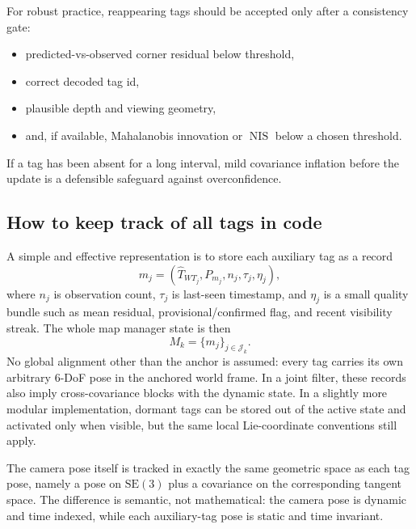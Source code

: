 \documentclass[11pt]{report}
\newcommand{\SE}{\mathrm{SE}(3)}
\newcommand{\NIS}{\operatorname{NIS}}
\begin{document}
For robust practice, reappearing tags should be accepted only after a consistency gate:
\begin{itemize}
    \item predicted-vs-observed corner residual below threshold,
    \item correct decoded tag id,
    \item plausible depth and viewing geometry,
    \item and, if available, Mahalanobis innovation or $\NIS$ below a chosen threshold.
\end{itemize}
If a tag has been absent for a long interval, mild covariance inflation before the update is a defensible safeguard against overconfidence.

\subsection{How to keep track of all tags in code}
A simple and effective representation is to store each auxiliary tag as a record
\[
m_j = (\widehat T_{WT_j},P_{m_j},n_j,\tau_j,\eta_j),
\]
where $n_j$ is observation count, $\tau_j$ is last-seen timestamp, and $\eta_j$ is a small quality bundle such as mean residual, provisional/confirmed flag, and recent visibility streak. The whole map manager state is then
\[
M_k=\{m_j\}_{j\in\mathcal J_k}.
\]
No global alignment other than the anchor is assumed: every tag carries its own arbitrary 6-DoF pose in the anchored world frame. In a joint filter, these records also imply cross-covariance blocks with the dynamic state. In a slightly more modular implementation, dormant tags can be stored out of the active state and activated only when visible, but the same local Lie-coordinate conventions still apply.

The camera pose itself is tracked in exactly the same geometric space as each tag pose, namely a pose on $\SE$ plus a covariance on the corresponding tangent space. The difference is semantic, not mathematical: the camera pose is dynamic and time indexed, while each auxiliary-tag pose is static and time invariant.
\end{document}

